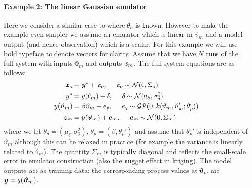 \documentclass[10pt,a4paper]{article}
\newcommand{\varthetab} {{\boldsymbol{\vartheta}}}
\newcommand{\evec} {\textbf{\textit{e}}}
\newcommand{\yvec} {\textbf{\textit{y}}}
\newcommand{\zvec} {\textbf{\textit{z}}}
\begin{document}
\paragraph{Example 2: The linear Gaussian emulator} Here we consider a similar case to \cite{Higdon_2004} where $\theta_o$ is known. However to make the example even simpler we assume an emulator which is linear in $\vartheta_m$ and a model output (and hence observation) which is a scalar. For this example we will use bold typeface to denote vectors for clarity. Assume that we have $N$ runs of the full system with inputs $\varthetab_m$ and outputs $\zvec_m$. The full system equations are as follows:
\begin{align}
\zvec_o &= \yvec^* + \evec_o,~~~~ \evec_o \sim \mathcal{N}(0,\Sigma_o) \\
y^* &= y(\theta_m) + \delta,~~~~ \delta \sim \mathcal{N}(\mu_\delta,\sigma^2_\delta) \\
y(\vartheta_m) &= \beta\vartheta_m + e_y,~~~~ e_y \sim \mathcal{GP}(0,k(\vartheta_m,\vartheta_m';\theta_p')) \\
\zvec_m &= y(\varthetab_m) + \evec_m, ~~~~ \evec_m \sim \mathcal{N}(0,\Sigma_m)
\end{align}
\noindent where we let $\theta_\delta = (\mu_\delta,\sigma^2_\delta)$, $\theta_p = (\beta,\theta_p')$ and assume that $\theta_p'$ is independent of $\vartheta_m$ although this can be relaxed in practice (for example the variance is linearly related to $\vartheta_m$). The quantity $\Sigma_m$ is typically diagonal and reflects the small-scale error in emulator construction (also the nugget effect in kriging). The model outputs act as training data; the corresponding process values at $\varthetab_m$ are $\yvec = y(\varthetab_m)$. 
\end{document}

